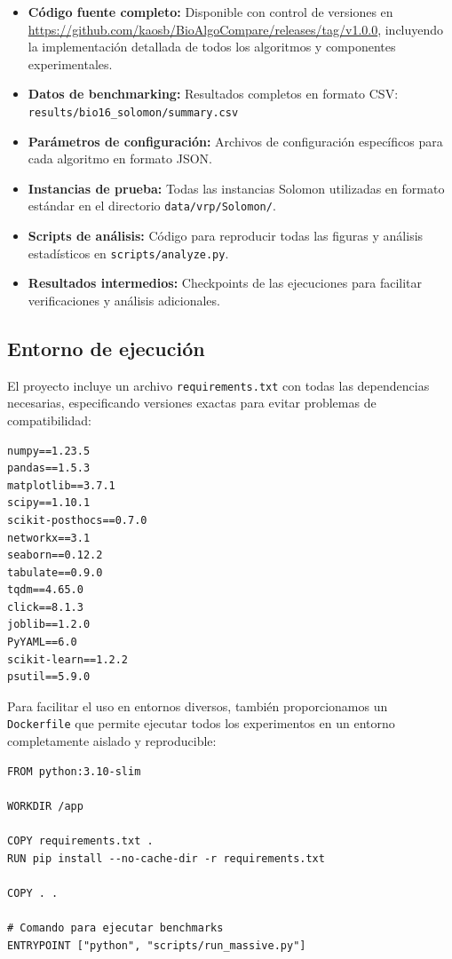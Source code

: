 \documentclass[conference,a4paper]{IEEEtran}
\begin{document}
\begin{itemize}
\item \textbf{Código fuente completo:} Disponible con control de versiones en \url{https://github.com/kaosb/BioAlgoCompare/releases/tag/v1.0.0}, incluyendo la implementación detallada de todos los algoritmos y componentes experimentales.
\item \textbf{Datos de benchmarking:} Resultados completos en formato CSV: \texttt{results/bio16\_solomon/summary.csv}
\item \textbf{Parámetros de configuración:} Archivos de configuración específicos para cada algoritmo en formato JSON.
\item \textbf{Instancias de prueba:} Todas las instancias Solomon utilizadas en formato estándar en el directorio \texttt{data/vrp/Solomon/}.
\item \textbf{Scripts de análisis:} Código para reproducir todas las figuras y análisis estadísticos en \texttt{scripts/analyze.py}.
\item \textbf{Resultados intermedios:} Checkpoints de las ejecuciones para facilitar verificaciones y análisis adicionales.
\end{itemize}

\subsection{Entorno de ejecución}

El proyecto incluye un archivo \texttt{requirements.txt} con todas las dependencias necesarias, especificando versiones exactas para evitar problemas de compatibilidad:

\begin{lstlisting}
numpy==1.23.5
pandas==1.5.3
matplotlib==3.7.1
scipy==1.10.1
scikit-posthocs==0.7.0
networkx==3.1
seaborn==0.12.2
tabulate==0.9.0
tqdm==4.65.0
click==8.1.3
joblib==1.2.0
PyYAML==6.0
scikit-learn==1.2.2
psutil==5.9.0
\end{lstlisting}

Para facilitar el uso en entornos diversos, también proporcionamos un \texttt{Dockerfile} que permite ejecutar todos los experimentos en un entorno completamente aislado y reproducible:

\begin{lstlisting}
FROM python:3.10-slim

WORKDIR /app

COPY requirements.txt .
RUN pip install --no-cache-dir -r requirements.txt

COPY . .

# Comando para ejecutar benchmarks
ENTRYPOINT ["python", "scripts/run_massive.py"]
\end{lstlisting}
\end{document}
